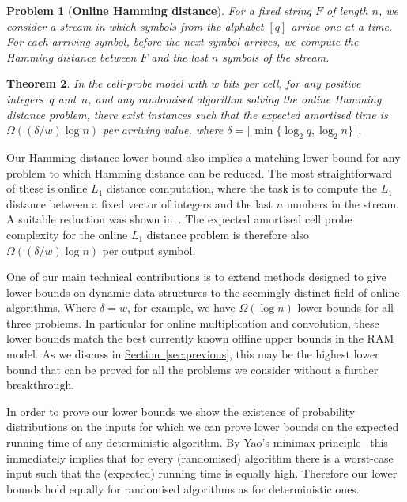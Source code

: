 \documentclass[11pt]{article}
\numberwithin{equation}{section}
\newtheorem{theorem}{Theorem}[section]
\theoremstyle{definition}
\theoremstyle{plain}
\newcommand{\expref}[2]{\hyperref[#2]{#1~\ref{#2}}}
\newtheorem{problem}[theorem]{Problem}
\begin{document}
%

\begin{problem}[\textbf{Online Hamming distance}]
  For a fixed string $F$ of length $n$, we consider a stream in which symbols from the alphabet $[q]$ arrive one at a time. For each arriving symbol, before the next symbol arrives, we
%
compute   %
the Hamming distance between $F$ and the last $n$ symbols of the stream.
\end{problem}


\begin{theorem}
	\label{thm:ham}
	In the cell-probe model with $w$ bits per cell, for any positive integers~$q$ and~$n$, and any randomised algorithm solving the online Hamming distance problem, there exist instances such that the expected amortised time is $\Omega(({\delta}/{w})\log n)$ per arriving value, where $\delta=\lceil \min\{\log_2q,\log_2n\} \rceil$.
\end{theorem}


%

%

Our Hamming distance lower bound also implies a matching lower bound for any problem
%
to which Hamming distance can be reduced.   %
The most straightforward of these is online $L_1$ distance computation, where the task is to
%
compute   %
the $L_1$ distance between a fixed vector of integers and the last $n$ numbers in the stream.
A suitable reduction was shown in~\cite{LP:2008}. The expected amortised cell probe complexity for the online $L_1$ distance problem is therefore also $\Omega{(({\delta}/{w}) \log n)}$ per
%
output symbol.  %

One of our main technical contributions is to extend  methods designed to give lower bounds on dynamic data structures to the seemingly distinct field of online algorithms.  Where $\delta = w$, for example, we have $\Omega(\log{n})$ lower bounds for all three problems. In particular for online multiplication and convolution, these lower bounds match the
%
best currently known   %
offline upper bounds in the RAM model. As we discuss in
%
\expref{Section}{sec:previous}, this may be the highest lower bound that can be
%
proved for all the problems we consider without a further
%
%
breakthrough.

In order to prove our lower bounds we show the existence of probability distributions on the inputs for which we can prove lower bounds on the expected running time of any deterministic algorithm. By Yao's minimax principle~\cite{Yao1977:Minimax} this immediately implies that for every (randomised) algorithm there is a worst-case input such that the (expected) running time is equally high. Therefore our lower bounds hold equally for randomised algorithms as for deterministic ones.
\end{document}
